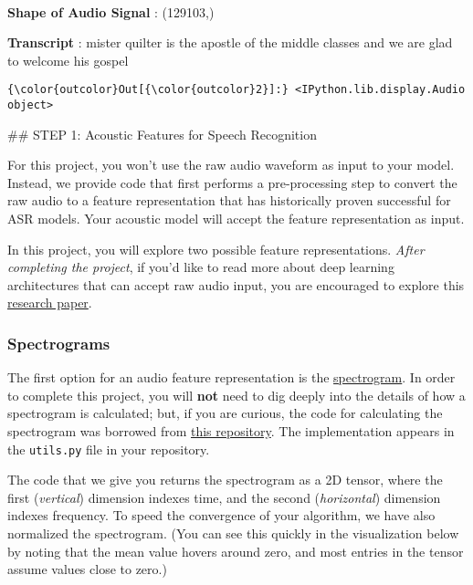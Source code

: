 \documentclass[11pt]{article}
\begin{document}
    \begin{center}
    \end{center}
    { \hspace*{\fill} \\}
    
    \textbf{Shape of Audio Signal} : (129103,)

    
    \textbf{Transcript} : mister quilter is the apostle of the middle
classes and we are glad to welcome his gospel

    
\begin{Verbatim}[commandchars=\\\{\}]
{\color{outcolor}Out[{\color{outcolor}2}]:} <IPython.lib.display.Audio object>
\end{Verbatim}
            
     \#\# STEP 1: Acoustic Features for Speech Recognition

For this project, you won't use the raw audio waveform as input to your
model. Instead, we provide code that first performs a pre-processing
step to convert the raw audio to a feature representation that has
historically proven successful for ASR models. Your acoustic model will
accept the feature representation as input.

In this project, you will explore two possible feature representations.
\emph{After completing the project}, if you'd like to read more about
deep learning architectures that can accept raw audio input, you are
encouraged to explore this
\href{https://pdfs.semanticscholar.org/a566/cd4a8623d661a4931814d9dffc72ecbf63c4.pdf}{research
paper}.

\subsubsection{Spectrograms}\label{spectrograms}

The first option for an audio feature representation is the
\href{https://www.youtube.com/watch?v=_FatxGN3vAM}{spectrogram}. In
order to complete this project, you will \textbf{not} need to dig deeply
into the details of how a spectrogram is calculated; but, if you are
curious, the code for calculating the spectrogram was borrowed from
\href{https://github.com/baidu-research/ba-dls-deepspeech}{this
repository}. The implementation appears in the \texttt{utils.py} file in
your repository.

The code that we give you returns the spectrogram as a 2D tensor, where
the first (\emph{vertical}) dimension indexes time, and the second
(\emph{horizontal}) dimension indexes frequency. To speed the
convergence of your algorithm, we have also normalized the spectrogram.
(You can see this quickly in the visualization below by noting that the
mean value hovers around zero, and most entries in the tensor assume
values close to zero.)
\end{document}
